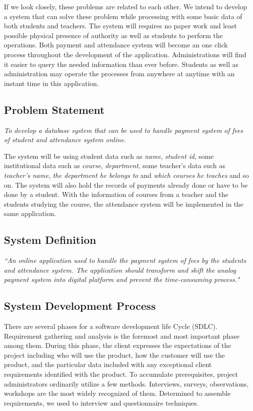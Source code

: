 If we look closely, these problems are related to each other. We intend to develop a system that can solve these problem while processing with some basic data of both students and teachers. The system will requires no paper work and least possible physical presence of authority as well as students to perform the operations. Both payment and attendance system will become an one click process throughout the development of the application. Administrations will find it easier to query the needed information than ever before. Students as well as administration may operate the processes from anywhere at anytime with an instant time in this application.

\subsection{Problem Statement}\label{subsec:ps} 

\emph{To develop a database system that can be used to handle payment system of fees of student and attendance system online.}

The system will be using student data such as \emph{name}, \emph{student id}, some institutional data such as \emph{course}, \emph{department}, some teacher's data such as \emph{teacher's name}, \emph{the department he belongs to} and \emph{which courses he teaches} and so on. The system will also hold the records of payments already done or have to be done by a student. With the information of courses from a teacher and the students studying the course, the attendance system will be implemented in the same application.

\clearpage

\subsection{System Definition}\label{subsec:sd} 

\textit{``An online application used to handle the payment system of fees by the students and attendance system. The application should transform and shift the analog payment system into digital platform and prevent the time-consuming process."}


\subsection{System Development Process}\label{subsec:sdp}

There are several phases for a software development life Cycle (SDLC). Requirement gathering and analysis is the foremost and most important phase among them. During this phase, the client expresses the expectations of the project including who will use the product, how the customer will use the product, and the particular data included with any exceptional client requirements identified with the product. To accumulate prerequisites, project administrators ordinarily utilize a few methods. Interviews, surveys, observations, workshops are the most widely recognized of them. Determined to assemble requirements, we used to interview and questionnaire techniques.\\

